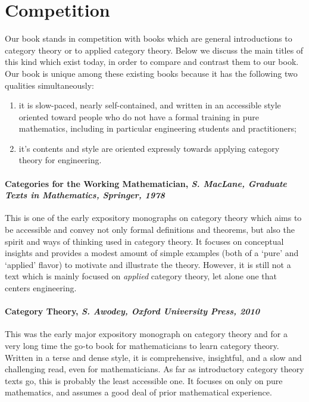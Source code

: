 \documentclass[10pt, article, one side]{memoir}
\begin{document}
    \section{Competition}
    \label{sec:competition}

    Our book stands in competition with books which are general introductions to category theory or to applied category theory.
    Below we discuss the main titles of this kind which exist today, in order to compare and contrast them to our book.
    Our book is unique among these existing books because it has the following two qualities simultaneously:
    \begin{enumerate}
        \item it is slow-paced, nearly self-contained, and written in an accessible style oriented toward people who do not have a formal training in pure mathematics, including in particular engineering students and practitioners;
        \item it's contents and style are oriented expressly towards applying category theory for engineering.
    \end{enumerate}

    \paragraph{Categories for the Working Mathematician, \emph{S.
            MacLane, Graduate Texts in Mathematics, Springer, 1978}}

This is one of the early expository monographs on category theory which aims to be accessible and convey not only formal definitions and theorems, but also the spirit and ways of thinking used in category theory. It focuses on conceptual insights and provides a modest amount of simple examples (both of a `pure' and `applied' flavor) to motivate and illustrate the theory. However, it is still not a text which is mainly focused on \emph{applied} category theory, let alone one that centers engineering.  

\paragraph{Category Theory, \emph{S. Awodey, Oxford University Press, 2010}}
    This was the early major expository monograph on category theory and for a very long time the go-to book for mathematicians to learn category theory.
    Written in a terse and dense style, it is comprehensive, insightful, and a slow and challenging read, even for mathematicians.
    As far as introductory category theory texts go, this is probably the least accessible one.
    It focuses on only on pure mathematics, and assumes a good deal of prior mathematical experience.
\end{document}
